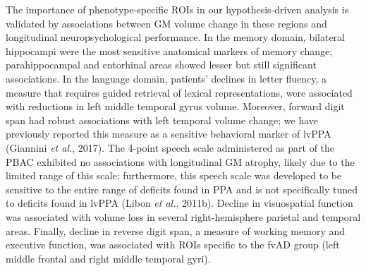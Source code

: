 \documentclass[]{article}
\begin{document}
The importance of phenotype-specific ROIs in our hypothesis-driven
analysis is validated by associations between GM volume change in these
regions and longitudinal neuropsychological performance. In the memory
domain, bilateral hippocampi were the most sensitive anatomical markers
of memory change; parahippocampal and entorhinal areas showed lesser but
still significant associations. In the language domain, patients'
declines in letter fluency, a measure that requires guided retrieval of
lexical representations, were associated with reductions in left middle
temporal gyrus volume. Moreover, forward digit span had robust
associations with left temporal volume change; we have previously
reported this measure as a sensitive behavioral marker of lvPPA
(Giannini \emph{et al.}, 2017). The 4-point speech scale administered as
part of the PBAC exhibited no associations with longitudinal GM atrophy,
likely due to the limited range of this scale; furthermore, this speech
scale was developed to be sensitive to the entire range of deficits
found in PPA and is not specifically tuned to deficits found in lvPPA
(Libon \emph{et al.}, 2011b). Decline in visuospatial function was
associated with volume loss in several right-hemisphere parietal and
temporal areas. Finally, decline in reverse digit span, a measure of
working memory and executive function, was associated with ROIs specific
to the fvAD group (left middle frontal and right middle temporal gyri).
\end{document}
